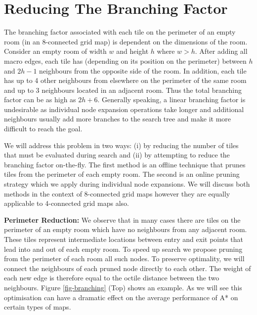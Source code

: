 \section{Reducing The Branching Factor}
The branching factor associated with each tile on the perimeter of an empty room (in an 8-connected 
grid map) is dependent on the dimensions of the room.
Consider an empty room of width $w$ and height $h$ where $w > h$.
After adding all macro edges, each tile has (depending on its position on the perimeter) 
between $h$ and $2h - 1$ neighbours from the opposite side 
of the room. 
In addition, each tile has up to 4 other neighbours from elsewhere on the perimeter of the same room and
up to 3 neighbours located in an adjacent room.
Thus the total branching factor can be as high as $2h + 6$.
Generally speaking, a linear branching factor is undesirable as individual node expansion operations 
take longer and additional neighbours usually add more branches to the search tree and make it more 
difficult to reach the goal.
\par
We will address this problem in two ways: (i) by reducing the number of tiles that must be evaluated during search and 
(ii) by attempting to reduce the branching factor on-the-fly.
The first method is an offline technique that prunes tiles from the perimeter of each empty room. 
The second is an online pruning strategy which we apply during individual node expansions.
We will discuss both methods in the context of 8-connected grid maps however
they are equally applicable to 4-connected grid maps also.

\textbf{Perimeter Reduction:}
We observe that in many cases there are tiles on the perimeter of an empty room which have no neighbours from any 
adjacent room. 
These tiles represent intermediate locations between entry and exit points that lead into and out of each empty room.
To speed up search we propose pruning from the perimeter of each room all such nodes.
To preserve optimality, we will connect the neighbours of each pruned node directly to each other.
The weight of each new edge is therefore equal to the octile distance between the two neighbours.
Figure \ref{fig-branching} (Top) shows an example.
As we will see this optimisation can have a dramatic effect on the average performance of
A* on certain types of maps.

